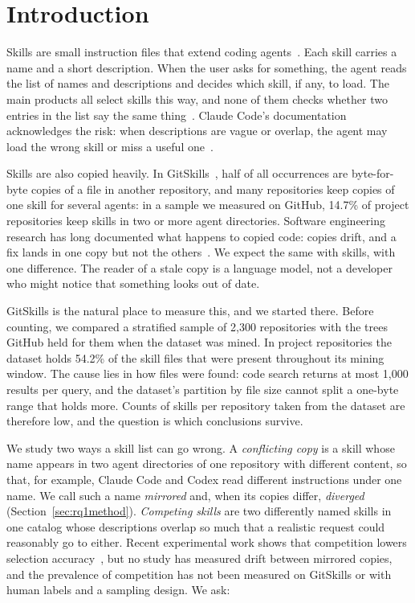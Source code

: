 \section{Introduction}
\label{sec:introduction}

Skills are small instruction files that extend coding agents~\cite{anthropicskillsblog}. Each skill carries a name and a short description. When the user asks for something, the agent reads the list of names and descriptions and decides which skill, if any, to load. The main products all select skills this way, and none of them checks whether two entries in the list say the same thing~\cite{claudecodeskills,codexskills,agentskillsspec}. Claude Code's documentation acknowledges the risk: when descriptions are vague or overlap, the agent may load the wrong skill or miss a useful one~\cite{claudecodeskills}.

Skills are also copied heavily. In GitSkills~\cite{gitskills}, half of all occurrences are byte-for-byte copies of a file in another repository, and many repositories keep copies of one skill for several agents: in a sample we measured on GitHub, 14.7\% of project repositories keep skills in two or more agent directories. Software engineering research has long documented what happens to copied code: copies drift, and a fix lands in one copy but not the others~\cite{kim2005genealogies,juergens2009clones}. We expect the same with skills, with one difference. The reader of a stale copy is a language model, not a developer who might notice that something looks out of date.

GitSkills is the natural place to measure this, and we started there. Before counting, we compared a stratified sample of 2,300 repositories with the trees GitHub held for them when the dataset was mined. In project repositories the dataset holds 54.2\% of the skill files that were present throughout its mining window. The cause lies in how files were found: code search returns at most 1,000 results per query, and the dataset's partition by file size cannot split a one-byte range that holds more. Counts of skills per repository taken from the dataset are therefore low, and the question is which conclusions survive.

We study two ways a skill list can go wrong. A \emph{conflicting copy} is a skill whose name appears in two agent directories of one repository with different content, so that, for example, Claude Code and Codex read different instructions under one name. We call such a name \emph{mirrored} and, when its copies differ, \emph{diverged} (Section~\ref{sec:rq1method}). \emph{Competing skills} are two differently named skills in one catalog whose descriptions overlap so much that a realistic request could reasonably go to either. Recent experimental work shows that competition lowers selection accuracy~\cite{li2026singleagent,chen2026scaling,song2026shadowing,yan2026oneskill}, but no study has measured drift between mirrored copies, and the prevalence of competition has not been measured on GitSkills or with human labels and a sampling design. We ask:

